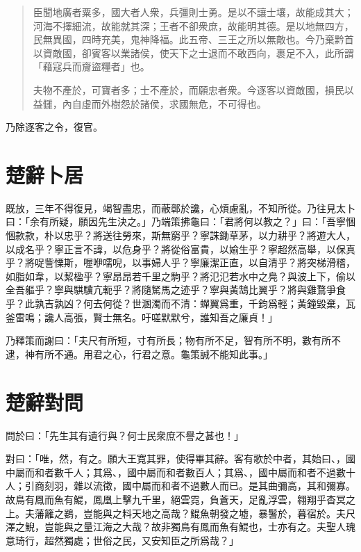 \begin{quotation}
臣聞地廣者粟多，國大者人衆，兵彊則士勇。是以不讓士壤，故能成其大；河海不擇細流，故能就其深；王者不卻衆庶，故能明其德。是以地無四方，民無異國，四時充美，鬼神降福。此五帝、三王之所以無敵也。今乃棄黔首以資敵國，卻賓客以業諸侯，使天下之士退而不敢西向，裹足不入，此所謂「藉寇兵而齎盜糧者」也。

夫物不產於，可寶者多；士不產於，而願忠者衆。今逐客以資敵國，損民以益讎，內自虛而外樹怨於諸侯，求國無危，不可得也。
\end{quotation}

乃除逐客之令，復官。

\theendnotes

\section[卜居\quad{\small 楚辭}]{{\normalsize 楚辭}\quad 卜居}
既放，三年不得復見，竭智盡忠，而蔽鄣於讒，心煩慮亂，不知所從。乃往見太卜曰：「余有所疑，願因先生決之。」乃端策拂龜曰：「君將何以教之？」曰：「吾寧悃悃款款，朴以忠乎？將送往勞來，斯無窮乎？寧誅鋤草茅，以力耕乎？將遊大人，以成名乎？寧正言不諱，以危身乎？將從俗富貴，以媮生乎？寧超然高舉，以保真乎？將哫訾慄斯，喔咿嚅唲，以事婦人乎？寧廉潔正直，以自清乎？將突梯滑稽，如脂如韋，以絜楹乎？寧昂昂若千里之駒乎？將氾氾若水中之鳧？與波上下，偷以全吾軀乎？寧與騏驥亢軛乎？將隨駑馬之迹乎？寧與黃鵠比翼乎？將與雞鶩爭食乎？此孰吉孰凶？何去何從？世溷濁而不清：蟬翼爲重，千鈞爲輕；黃鐘毀棄，瓦釜雷鳴；讒人高張，賢士無名。吁嗟默默兮，誰知吾之廉貞！」

乃釋策而謝曰：「夫尺有所短，寸有所長；物有所不足，智有所不明，數有所不逮，神有所不通。用君之心，行君之意。龜策誠不能知此事。」

\section[宋玉對楚王問\quad{\small 楚辭}]{{\normalsize 楚辭}\quad {}對問}
問於曰：「先生其有遺行與？何士民衆庶不譽之甚也！」

對曰：「唯，然，有之。願大王寬其罪，使得畢其辭。客有歌於中者，其始曰、，國中屬而和者數千人；其爲、，國中屬而和者數百人；其爲、，國中屬而和者不過數十人；引商刻羽，雜以流徵，國中屬而和者不過數人而已。是其曲彌高，其和彌寡。故鳥有鳳而魚有鯤，鳳凰上擊九千里，絕雲霓，負蒼天，足亂浮雲，翱翔乎杳冥之上。夫藩籬之鷃，豈能與之料天地之高哉？鯤魚朝發之墟，暴鬐於，暮宿於。夫尺澤之鯢，豈能與之量江海之大哉？故非獨鳥有鳳而魚有鯤也，士亦有之。夫聖人瑰意琦行，超然獨處；世俗之民，又安知臣之所爲哉？」

